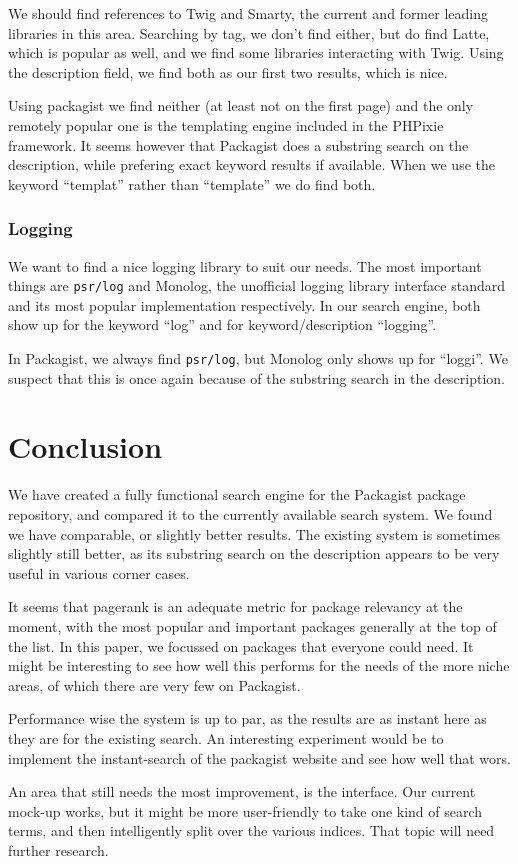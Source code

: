 \documentclass{article}
\begin{document}
We should find references to Twig and Smarty, the current and former leading libraries in this area. Searching by tag, we don't find either, but do find Latte, which is popular as well, and we find some libraries interacting with Twig. Using the description field, we find both as our first two results, which is nice.

Using packagist we find neither (at least not on the first page) and the only remotely popular one is the templating engine included in the PHPixie framework. It seems however that Packagist does a substring search on the description, while prefering exact keyword results if available. When we use the keyword ``templat'' rather than ``template'' we do find both.

\subsubsection{Logging}

We want to find a nice logging library to suit our needs. The most important things are \texttt{psr/log} and Monolog, the unofficial logging library interface standard and its most popular implementation respectively. In our search engine, both show up for the keyword ``log'' and for keyword/description ``logging''.

In Packagist, we always find \texttt{psr/log}, but Monolog only shows up for ``loggi''. We suspect that this is once again because of the substring search in the description.


\section{Conclusion}

We have created a fully functional search engine for the Packagist package repository, and compared it to the currently available search system. We found we have comparable, or slightly better results. The existing system is sometimes slightly still better, as its substring search on the description appears to be very useful in various corner cases.

It seems that pagerank is an adequate metric for package relevancy at the moment, with the most popular and important packages generally at the top of the list. In this paper, we focussed on packages that everyone could need. It might be interesting to see how well this performs for the needs of the more niche areas, of which there are very few on Packagist.

Performance wise the system is up to par, as the results are as instant here as they are for the existing search. An interesting experiment would be to implement the instant-search of the packagist website and see how well that wors.

An area that still needs the most improvement, is the interface. Our current mock-up works, but it might be more user-friendly to take one kind of search terms, and then intelligently split over the various indices. That topic will need further research.

{}

\end{document}
